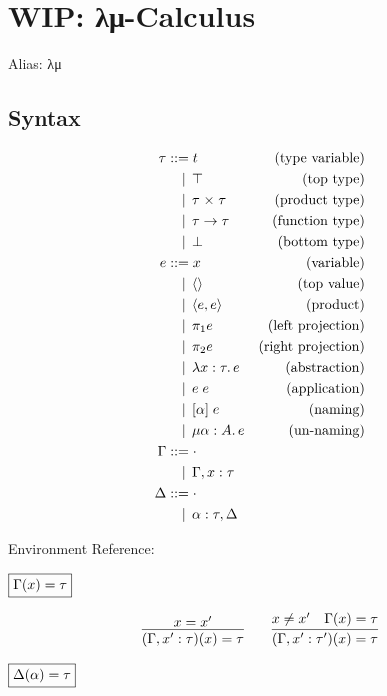 \section{WIP: λμ-Calculus}

Alias: λμ

\subsection{Syntax}

\begin{align*}
  \tau
  &\BNFassign t &(\text{type variable}) \\
  &\BNFor \top &(\text{top type}) \\
  &\BNFor \tau \multi \tau &(\text{product type}) \\
  &\BNFor \tau \to \tau &(\text{function type}) \\
  &\BNFor \bot &(\text{bottom type}) \\
  e
  &\BNFassign x &(\text{variable}) \\
  &\BNFor \langle\rangle &(\text{top value}) \\
  &\BNFor \langle e, e\rangle &(\text{product}) \\
  &\BNFor \pi_1 e &(\text{left projection}) \\
  &\BNFor \pi_2 e &(\text{right projection}) \\
  &\BNFor \lambda x: \tau\ldotp e &(\text{abstraction}) \\
  &\BNFor e\; e &(\text{application}) \\
  &\BNFor [\alpha]\; e &(\text{naming}) \\
  &\BNFor \mu \alpha: A\ldotp e &(\text{un-naming}) \\
  \Gamma
  &\BNFassign \cdot \\
  &\BNFor \Gamma, x: \tau \\
  \Delta
  &\BNFassign \cdot \\
  &\BNFor \alpha: \tau, \Delta
\end{align*}

Environment Reference:

$\fbox{$\Gamma(x) = \tau$}$

\begin{gather*}
  \infer{(\Gamma, x': \tau)(x) = \tau}{
    x = x'
  }
  \hspace{2em}
  \infer{(\Gamma, x': \tau')(x) = \tau}{
    x \neq x'
    &
    \Gamma(x) = \tau
  }
\end{gather*}

$\fbox{$\Delta(\alpha) = \tau$}$

